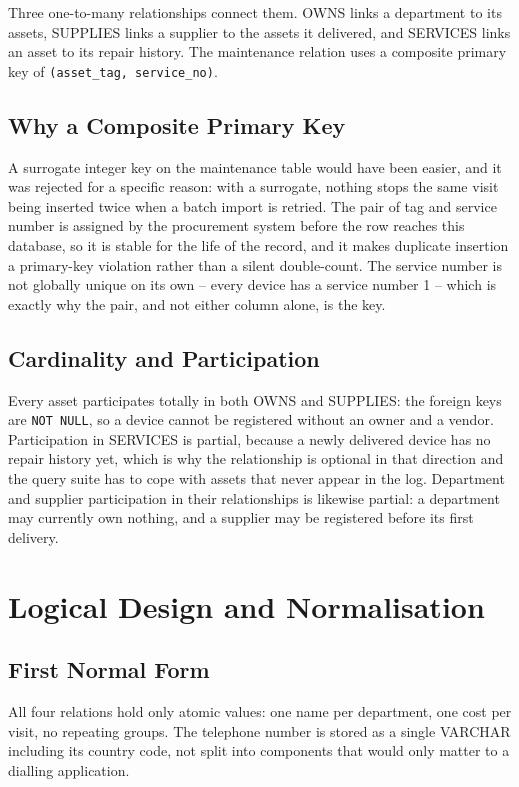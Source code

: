\documentclass[conference,9pt]{IEEEtran}
\begin{document}
Three one-to-many relationships connect them. OWNS links a department to its
assets, SUPPLIES links a supplier to the assets it delivered, and SERVICES
links an asset to its repair history. The maintenance relation uses a
composite primary key of \texttt{(asset\_tag, service\_no)}.

\subsection{Why a Composite Primary Key}
A surrogate integer key on the maintenance table would have been easier, and
it was rejected for a specific reason: with a surrogate, nothing stops the
same visit being inserted twice when a batch import is retried. The pair of
tag and service number is assigned by the procurement system before the row
reaches this database, so it is stable for the life of the record, and it
makes duplicate insertion a primary-key violation rather than a silent
double-count. The service number is not globally unique on its own -- every
device has a service number 1 -- which is exactly why the pair, and not either
column alone, is the key.

\subsection{Cardinality and Participation}
Every asset participates totally in both OWNS and SUPPLIES: the foreign keys
are \texttt{NOT NULL}, so a device cannot be registered without an owner and a
vendor. Participation in SERVICES is partial, because a newly delivered device
has no repair history yet, which is why the relationship is optional in that
direction and the query suite has to cope with assets that never appear in the
log. Department and supplier participation in their relationships is likewise
partial: a department may currently own nothing, and a supplier may be
registered before its first delivery.

\section{Logical Design and Normalisation}
\subsection{First Normal Form}
All four relations hold only atomic values: one name per department, one cost
per visit, no repeating groups. The telephone number is stored as a single
VARCHAR including its country code, not split into components that would only
matter to a dialling application.
\end{document}
